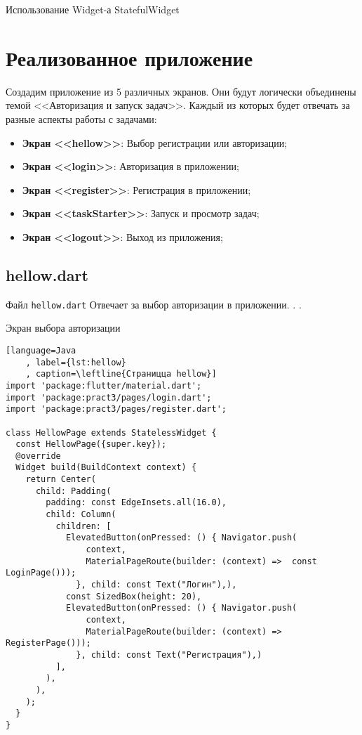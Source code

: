 \begin{image}
	\caption{Использование Widget-а StatefulWidget}
	\label{fig:stateful}
\end{image}

\clearpage

\section{Реализованное приложение}

Создадим приложение из 5 различных экранов.
Они будут логически объединены темой <<Авторизация и запуск задач>>.
Каждый из которых будет отвечать за разные аспекты работы с задачами:

\begin{itemize}
	\item \textbf{Экран <<hellow>>}:
		Выбор регистрации или авторизации;
	\item \textbf{Экран <<login>>}:
		Авторизация в приложении;
	\item \textbf{Экран <<register>>}:
		Регистрация в приложении;
	\item \textbf{Экран <<taskStarter>>}:
		Запуск и просмотр задач;
	\item \textbf{Экран <<logout>>}:
		Выход из приложения;
\end{itemize}

\clearpage
\subsection{hellow.dart}

Файл \texttt{hellow.dart} Отвечает за выбор авторизации в приложении.
.
.

\begin{image}
	\caption{Экран выбора авторизации}
	\label{fig:hellow}
\end{image}
\clearpage
\begin{lstlisting}[language=Java
	, label={lst:hellow}
	, caption=\leftline{Страницца hellow}]
import 'package:flutter/material.dart';
import 'package:pract3/pages/login.dart';
import 'package:pract3/pages/register.dart';

class HellowPage extends StatelessWidget {
  const HellowPage({super.key});
  @override
  Widget build(BuildContext context) {
    return Center(
      child: Padding(
        padding: const EdgeInsets.all(16.0),
        child: Column(
          children: [
            ElevatedButton(onPressed: () { Navigator.push(
                context,
                MaterialPageRoute(builder: (context) =>  const LoginPage()));
              }, child: const Text("Логин"),),
            const SizedBox(height: 20),
            ElevatedButton(onPressed: () { Navigator.push(
                context,
                MaterialPageRoute(builder: (context) =>  RegisterPage()));
              }, child: const Text("Регистрация"),)
          ],
        ),
      ),
    );
  }
}
\end{lstlisting}
\clearpage

